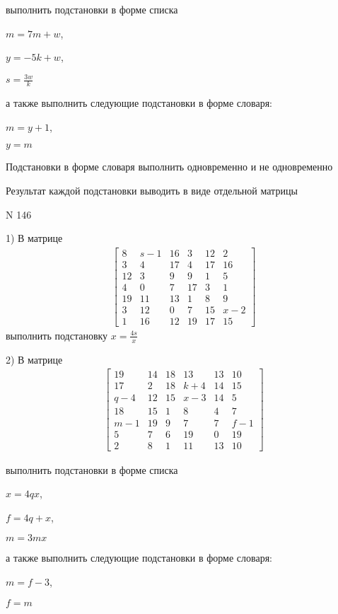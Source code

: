 \documentclass[11pt]{report}
\begin{document}
выполнить подстановки в форме списка

$m=7 m + w$,

$y=- 5 k + w$,

$s=\frac{3 w}{k}$

а также выполнить следующие подстановки в форме словаря:

$m=y + 1$,

$y=m$


    Подстановки в форме словаря выполнить одновременно и не одновременно


    Результат каждой подстановки выводить в виде отдельной матрицы

\newpage
N 146


    1) В матрице
\begin{align*}
\left[\begin{matrix}8 & s - 1 & 16 & 3 & 12 & 2\\3 & 4 & 17 & 4 & 17 & 16\\12 & 3 & 9 & 9 & 1 & 5\\4 & 0 & 7 & 17 & 3 & 1\\19 & 11 & 13 & 1 & 8 & 9\\3 & 12 & 0 & 7 & 15 & x - 2\\1 & 16 & 12 & 19 & 17 & 15\end{matrix}\right]
\end{align*}
выполнить подстановку $x=\frac{4 s}{x}$


    2) В матрице
\begin{align*}
\left[\begin{matrix}19 & 14 & 18 & 13 & 13 & 10\\17 & 2 & 18 & k + 4 & 14 & 15\\q - 4 & 12 & 15 & x - 3 & 14 & 5\\18 & 15 & 1 & 8 & 4 & 7\\m - 1 & 19 & 9 & 7 & 7 & f - 1\\5 & 7 & 6 & 19 & 0 & 19\\2 & 8 & 1 & 11 & 13 & 10\end{matrix}\right]
\end{align*}

выполнить подстановки в форме списка

$x=4 q x$,

$f=4 q + x$,

$m=3 m x$

а также выполнить следующие подстановки в форме словаря:

$m=f - 3$,

$f=m$
\end{document}
